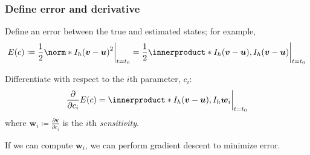 \documentclass{beamer}
\newcommand{\bu}{\boldsymbol u}
\newcommand{\bv}{\boldsymbol v}
\newcommand{\bw}{\boldsymbol w}
\begin{document}

\begin{frame}
  \frametitle{Define error and derivative}
  Define an error between the true and estimated states; for example,
  \begin{equation*}
    E(c) \coloneq \frac12 \norm*{I_h(\bv - \bu)}^2 \bigg \lvert_{t=t_0}
    = \frac12 \innerproduct*{I_h(\bv - \bu), I_h(\bv - \bu)} \bigg \lvert_{t=t_0}
  \end{equation*}

  Differentiate with respect to the $i$th parameter, $c_i$:
  \begin{equation*}
    \frac{\partial}{\partial c_i} E(c) = \innerproduct*{I_h(\bv - \bu),
    I_h \bw_i} \bigg \lvert_{t=t_0}
  \end{equation*}
  where $\bw_i \coloneq \frac{\partial \bv}{\partial c_i}$ is the $i$th
  \textit{sensitivity}.

  If we can compute $\bw_i$, we can perform gradient descent to minimize error.
\end{frame}
\end{document}
